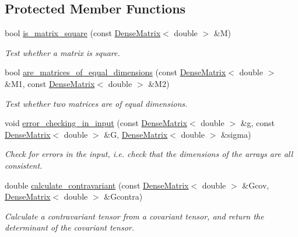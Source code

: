 \subsection*{Protected Member Functions}
\begin{DoxyCompactItemize}
\item 
bool \hyperlink{classoomph_1_1ConstitutiveLaw_a73f01e1459e7ba998ef78f7ece6baa37}{is\+\_\+matrix\+\_\+square} (const \hyperlink{classoomph_1_1DenseMatrix}{Dense\+Matrix}$<$ double $>$ \&M)
\begin{DoxyCompactList}\small\item\em Test whether a matrix is square. \end{DoxyCompactList}\item 
bool \hyperlink{classoomph_1_1ConstitutiveLaw_a8a89bb96a9b922294509923563a13063}{are\+\_\+matrices\+\_\+of\+\_\+equal\+\_\+dimensions} (const \hyperlink{classoomph_1_1DenseMatrix}{Dense\+Matrix}$<$ double $>$ \&M1, const \hyperlink{classoomph_1_1DenseMatrix}{Dense\+Matrix}$<$ double $>$ \&M2)
\begin{DoxyCompactList}\small\item\em Test whether two matrices are of equal dimensions. \end{DoxyCompactList}\item 
void \hyperlink{classoomph_1_1ConstitutiveLaw_a01763658a56a962460a80607653a33b4}{error\+\_\+checking\+\_\+in\+\_\+input} (const \hyperlink{classoomph_1_1DenseMatrix}{Dense\+Matrix}$<$ double $>$ \&g, const \hyperlink{classoomph_1_1DenseMatrix}{Dense\+Matrix}$<$ double $>$ \&G, \hyperlink{classoomph_1_1DenseMatrix}{Dense\+Matrix}$<$ double $>$ \&sigma)
\begin{DoxyCompactList}\small\item\em Check for errors in the input, i.\+e. check that the dimensions of the arrays are all consistent. \end{DoxyCompactList}\item 
double \hyperlink{classoomph_1_1ConstitutiveLaw_a5c188df10b08b340b923c3a733c0d178}{calculate\+\_\+contravariant} (const \hyperlink{classoomph_1_1DenseMatrix}{Dense\+Matrix}$<$ double $>$ \&Gcov, \hyperlink{classoomph_1_1DenseMatrix}{Dense\+Matrix}$<$ double $>$ \&Gcontra)
\begin{DoxyCompactList}\small\item\em Calculate a contravariant tensor from a covariant tensor, and return the determinant of the covariant tensor. \end{DoxyCompactList}\item 

\end{DoxyCompactItemize}
